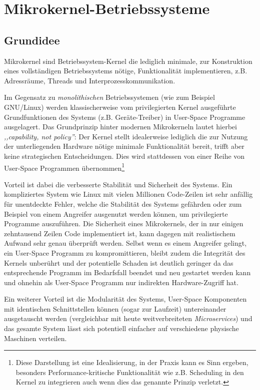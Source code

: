 \section{Mikrokernel-Betriebssysteme}
\label{sec:mkos}

\subsection{Grundidee}

Mikrokernel sind Betriebssystem-Kernel die lediglich minimale, zur Konstruktion
eines vollständigen Betriebssystems nötige, Funktionalität implementieren, z.B.
Adressräume, Threads und Interprozesskommunikation.

Im Gegensatz zu \textit{monolithischen} Betriebssystemen (wie zum Beispiel
GNU/Linux) werden klassischerweise vom privilegierten Kernel ausgeführte
Grundfunktionen des Systems (z.B. Geräte-Treiber) in User-Space Programme
ausgelagert. Das Grundprinzip hinter modernen Mikrokerneln lautet hierbei
\textit{,,capability, not policy''}: Der Kernel stellt idealerweise lediglich
die zur Nutzung der unterliegenden Hardware nötige minimale Funktionalität
bereit, trifft aber keine strategischen Entscheidungen. Dies wird stattdessen
von einer Reihe von User-Space Programmen übernommen\footnote{Diese Darstellung
ist eine Idealisierung, in der Praxis kann es Sinn ergeben, besonders
Performance-kritische Funktionalität wie z.B.  Scheduling in den Kernel zu
integrieren auch wenn dies das genannte Prinzip verletzt.}

Vorteil ist dabei die verbesserte Stabilität und Sicherheit des Systems.  Ein
kompliziertes System wie Linux mit vielen Millionen Code-Zeilen ist sehr
anfällig für unentdeckte Fehler, welche die Stabilität des Systems gefährden
oder zum Beispiel von einem Angreifer ausgenutzt werden können, um
privilegierte Programme auszuführen.  Die Sicherheit eines Mikrokernels, der in
nur einigen zehntausend Zeilen Code implementiert ist, kann dagegen mit
realistischem Aufwand sehr genau überprüft werden.  Selbst wenn es einem
Angreifer gelingt, ein User-Space Programm zu kompromittieren, bleibt zudem die
Integrität des Kernels unberührt und der potentielle Schaden ist deutlich
geringer da das entsprechende Programm im Bedarfsfall beendet und neu gestartet
werden kann und ohnehin als User-Space Programm nur indirekten Hardware-Zugriff
hat.

Ein weiterer Vorteil ist die Modularität des Systems, User-Space Komponenten
mit identischen Schnittstellen können (sogar zur Laufzeit) untereinander
ausgetauscht werden (vergleichbar mit heute weitverbreiteten
\textit{Microservices}) und das gesamte System lässt sich potentiell einfacher
auf verschiedene physische Maschinen verteilen.

